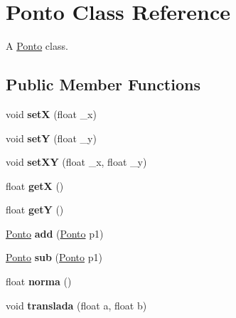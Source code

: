 \hypertarget{classPonto}{}\section{Ponto Class Reference}
\label{classPonto}


A \mbox{\hyperlink{classPonto}{Ponto}} class.  


\subsection*{Public Member Functions}
\begin{DoxyCompactItemize}
\item 
\mbox{\label{classPonto_a22129ad4dbf8019c479021d70a9f6774}} 
void {\bfseries setX} (float \+\_\+x)
\item 
\mbox{\label{classPonto_a2d9e5b9fade9d3f3f21122a2dc2f5e11}} 
void {\bfseries setY} (float \+\_\+y)
\item 
\mbox{\label{classPonto_a827488219a7da184d440f687cec49ce6}} 
void {\bfseries set\+XY} (float \+\_\+x, float \+\_\+y)
\item 
\mbox{\label{classPonto_ae4823d6ee26ff3448ee403d26a3c6d2f}} 
float {\bfseries getX} ()
\item 
\mbox{\label{classPonto_ab120600953e6544301223b9b05a43ee5}} 
float {\bfseries getY} ()
\item 
\mbox{\label{classPonto_abb68d6122278de262e8ed1c70714e3d9}} 
\mbox{\hyperlink{classPonto}{Ponto}} {\bfseries add} (\mbox{\hyperlink{classPonto}{Ponto}} p1)
\item 
\mbox{\label{classPonto_a8404fcad0fca2ce768ab9e1550f5d3a0}} 
\mbox{\hyperlink{classPonto}{Ponto}} {\bfseries sub} (\mbox{\hyperlink{classPonto}{Ponto}} p1)
\item 
\mbox{\label{classPonto_a9b0ddbdddd05edbc4d45ef0671a628c6}} 
float {\bfseries norma} ()
\item 
\mbox{\label{classPonto_a96a4395204ec010814e67d20705e630f}} 
void {\bfseries translada} (float a, float b)
\item 

\end{DoxyCompactItemize}
